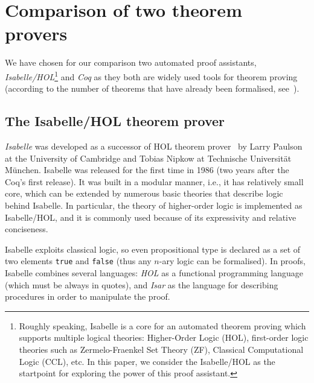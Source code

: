 \documentclass[article]{aaltoseries}
\begin{document}


\section{Comparison of two theorem provers}
\label{sec:comparison}

We have chosen for our comparison two automated proof assistants, \textit{Isabelle/HOL}\footnote{Roughly speaking, Isabelle is a core for an automated theorem proving which supports multiple logical theories: Higher-Order Logic (HOL), first-order logic theories such as Zermelo-Fraenkel Set Theory (ZF), Classical Computational Logic (CCL), etc. In this paper, we consider the Isabelle/HOL as the startpoint for exploring the power of this proof assistant.} and \textit{Coq} as they both are widely used tools for theorem proving (according to the number of theorems that have already been formalised, see~\cite{Wiedijk100}).



\subsection{The Isabelle/HOL theorem prover}
\label{sec:prover_isabelle}

\textit{Isabelle} was developed as a successor of HOL theorem prover~\cite{tool_HOL} by Larry Paulson at the University of Cambridge and Tobias Nipkow at Technische Universität München. Isabelle was released for the first time in 1986 (two years after the Coq's first release). It was built in a modular manner, i.e., it has relatively small core, which can be extended by numerous basic theories that describe logic behind Isabelle. In particular, the theory of higher-order logic is implemented as Isabelle/HOL, and it is commonly used because of its expressivity and relative conciseness. 

Isabelle exploits classical logic, so even propositional type is declared as a set of two elements \texttt{true} and \texttt{false} (thus any $n$-ary logic can be formalised). In proofs, Isabelle combines several languages: \textit{HOL} as a functional programming language (which must be always in quotes), and \textit{Isar} as the language for describing procedures in order to manipulate the proof.
\end{document}
